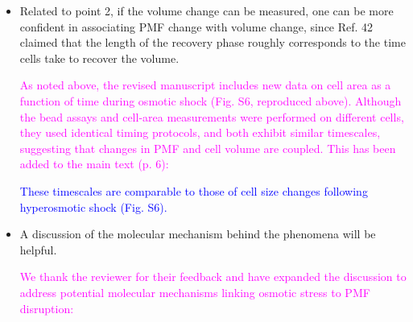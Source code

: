 \documentclass[11pt, letterpaper]{article}%
\newcommand{\revised}{\textcolor{blue}}
\newcommand{\response}{\textcolor{magenta}}
\begin{document}
\begin{itemize}
\response{We repeated the sucrose shock experiments in the presence of osmoprotectants but did not find an increase in rotation speed following shock~(Figs.~S3, reproduced above).}

\response{As discussed above, the discrepancy between our results and those of Rosko et al. may arise from several experimental differences, including the initial motor load, the presence of quiescent media, manual exchange of media, and the higher optical densities of the cultures used in their experiments.}

\item Related to point 2, if the volume change can be measured, one can be more confident in associating PMF change with volume change, since Ref. 42 claimed that the length of the recovery phase roughly corresponds to the time cells take to recover the volume.
    
\response{As noted above, the revised manuscript includes new data on cell area as a function of time during osmotic shock (Fig. S6, reproduced above). Although the bead assays and cell-area measurements were performed on different cells, they used identical timing protocols, and both exhibit similar timescales, suggesting that changes in PMF and cell volume are coupled. This has been added to the main text (p. 6):}

\begin{mdframed}
\footnotesize\revised{These timescales are comparable to those of cell size changes following hyperosmotic shock (Fig. S6).}
\end{mdframed}

\item A discussion of the molecular mechanism behind the phenomena will be helpful.
    
\response{We thank the reviewer for their feedback and have expanded the discussion to address potential molecular mechanisms linking osmotic stress to PMF disruption:}


\end{itemize}
\end{document}
